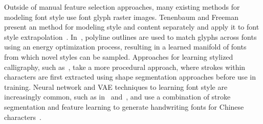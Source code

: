 Outside of manual feature selection approaches, many existing methods for modeling font style use font glyph raster images.
Tenenbaum and Freeman present an method for modeling style and content separately and apply it to font style extrapolation~\cite{tenenbaum1997separating}.
In~\cite{campbell2014learning}, polyline outlines are used to match glyphs across fonts using an energy optimization process, resulting in a learned manifold of fonts from which novel styles can be sampled.
Approaches for learning stylized calligraphy, such as~\cite{xu2005automatic}, take a more procedural approach, where strokes within characters are first extracted using shape segmentation approaches before use in training.
Neural network and VAE techniques to learning font style are increasingly common, such as in~\cite{upchurch2016z} and~\cite{wang2015deepfont}, and \citeauthor{lian2016automatic} use a combination of stroke segmentation and feature learning to generate handwriting fonts for Chinese characters~\cite{lian2016automatic}.
